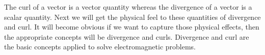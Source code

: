   The curl of a vector is a vector quantity whereas the divergence of a vector is a scalar quantity. Next we will get the physical feel to these quantities of divergence and curl. It will become obvious if we want to capture those physical effects, then the appropriate concepts will be divergence and curls. Divergence and curl are the basic concepts applied to solve electromagnetic problems. 